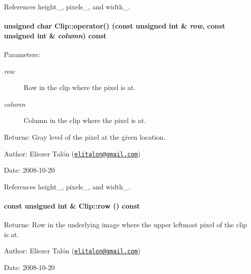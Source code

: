 References height\_\-, pixels\_\-, and width\_\-.\hypertarget{class_clip_16b24276181affc5086cb4fe83269fb8}{
\paragraph[operator()]{\setlength{\rightskip}{0pt plus 5cm}unsigned char Clip::operator() (const unsigned int \& {\em row}, \/  const unsigned int \& {\em column}) const}\hfill}
\label{class_clip_16b24276181affc5086cb4fe83269fb8}


\begin{Desc}
\item[Parameters:]
\begin{description}
\item[{\em row}]Row in the clip where the pixel is at. \item[{\em column}]Column in the clip where the pixel is at.\end{description}
\end{Desc}
\begin{Desc}
\item[Returns:]Gray level of the pixel at the given location.\end{Desc}
\begin{Desc}
\item[Author:]Eliezer Talón (\href{mailto:elitalon@gmail.com}{\tt elitalon@gmail.com}) \end{Desc}
\begin{Desc}
\item[Date:]2008-10-20 \end{Desc}


References height\_\-, pixels\_\-, and width\_\-.\hypertarget{class_clip_1a1d1fd626d1325f0f2b9184de4c89b8}{
\paragraph[row]{\setlength{\rightskip}{0pt plus 5cm}const unsigned int \& Clip::row () const}\hfill}
\label{class_clip_1a1d1fd626d1325f0f2b9184de4c89b8}


\begin{Desc}
\item[Returns:]Row in the underlying image where the upper leftmost pixel of the clip is at.\end{Desc}
\begin{Desc}
\item[Author:]Eliezer Talón (\href{mailto:elitalon@gmail.com}{\tt elitalon@gmail.com}) \end{Desc}
\begin{Desc}
\item[Date:]2008-10-20 \end{Desc}


